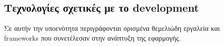 \subsection{Τεχνολογίες σχετικές με το development}

Σε αυτήν την υποενότητα περιγράφονται ορισμένα θεμελιώδη εργαλεία και frameworks που συνετέλεσαν στην ανάπτυξη της εφαρμογής.




